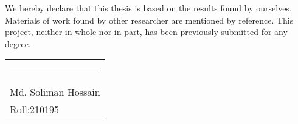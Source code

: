 We hereby declare that this thesis is based on the results found by ourselves.
Materials of work found by other researcher are mentioned by reference. This project,
neither in whole nor in part, has been previously submitted for any degree.

\vspace{1in}


\noindent \begin{tabular}{p{4cm}}
\rule{4cm}{1pt}
\\Md. Soliman Hossain
\\Roll:210195
\end{tabular}


